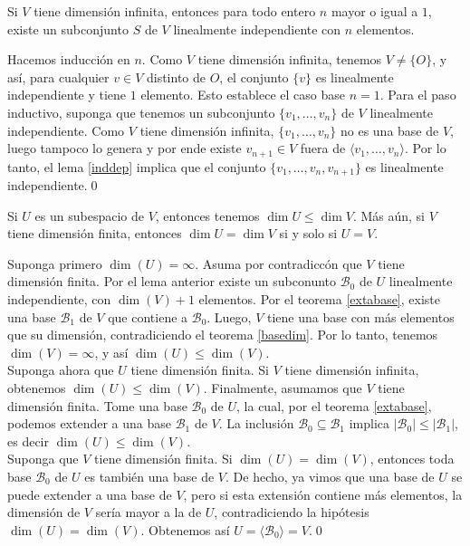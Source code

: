 \begin{lema}
Si $V$ tiene dimensi\'on infinita, entonces para todo entero $n$ mayor o igual a $1$, existe un subconjunto $S$ de $V$ linealmente independiente con $n$ elementos.
\end{lema}

\dem Hacemos inducci\'on en $n$. Como $V$ tiene dimensi\'on infinita, tenemos $V\ne\{O\}$, y as\'i, para cualquier $v\in V$ distinto de $O$, el conjunto $\{v\}$ es linealmente independiente y  tiene $1$ elemento. Esto establece el caso base $n=1$. Para el paso inductivo, suponga que tenemos un subconjunto $\{v_1,\ldots,v_n\}$ de $V$ linealmente independiente. Como $V$ tiene dimensi\'on infinita, $\{v_1,\ldots,v_n\}$ no es una base de $V$, luego tampoco lo genera y por ende existe $v_{n+1}\in V$ fuera de $\langle v_1,\ldots,v_n\rangle$. Por lo tanto, el lema \ref{inddep} implica que el conjunto $\{v_1,\ldots,v_n,v_{n+1}\}$ es linealmente independiente.\qed

\begin{teo}\label{monodim}
Si $U$ es un subespacio de $V$, entonces tenemos $\dim U\le \dim V$. M\'as a\'un, si $V$ tiene dimensi\'on finita, entonces $\dim U=\dim V$ si y solo si $U=V$.
\end{teo}

\dem Suponga primero $\dim(U)=\infty$. Asuma por contradicc\'on que $V$ tiene dimensi\'on finita. Por el lema anterior existe un subconunto $\mathcal{B}_0$ de $ U$ linealmente independiente, con $\dim(V)+1$ elementos. Por el teorema \ref{extabase}, existe una base $\mathcal{B}_1$ de $V$ que contiene a $\mathcal{B}_0$. Luego, $V$ tiene una base con m\'as elementos que su dimensi\'on, contradiciendo el teorema \ref{basedim}. Por lo tanto, tenemos $\dim(V)=\infty$, y as\'i $\dim(U)\le\dim(V)$.\\
Suponga ahora que $U$ tiene dimensi\'on finita. Si $V$ tiene dimensi\'on infinita, obtenemos $\dim(U)\le\dim(V)$. Finalmente, asumamos que $V$ tiene dimensi\'on finita. Tome una base $\mathcal{B}_0$ de $U$, la cual, por el teorema \ref{extabase}, podemos extender a una base $\mathcal{B}_1$ de $V$. La inclusi\'on $\mathcal{B}_0\subseteq \mathcal{B}_1$ implica $|\mathcal{B}_0|\le|\mathcal{B}_1|$, es decir $\dim(U)\le\dim(V)$.\\
Suponga que $V$ tiene dimensi\'on finita. Si $\dim(U)=\dim(V)$, entonces toda base $\mathcal{B}_0$ de $U$ es tambi\'en una base de $V$. De hecho, ya vimos que una base de $U$ se puede extender a una base de $V$, pero si esta extensi\'on contiene m\'as elementos, la dimensi\'on de $V$ ser\'ia mayor a la de $U$, contradiciendo la hip\'otesis $\dim(U)=\dim(V)$. Obtenemos as\'i $U=\langle \mathcal{B}_0\rangle=V$.\qed

